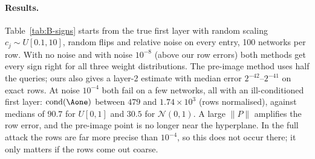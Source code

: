 \paragraph{Results.}
Table~\ref{tab:B-signs} starts from the true first layer with random scaling
$c_j\sim U[0.1,10]$, random flips and relative noise on every entry, 100
networks per row. With no noise and with noise $10^{-8}$ (above our row
errors) both methods get every sign right for all three weight distributions.
The pre-image method uses half the queries; ours also gives a layer-2
estimate with median error $2^{-42}$--$2^{-41}$ on exact rows. At noise
$10^{-4}$ both fail on a few networks, all with an ill-conditioned first
layer: $\operatorname{cond}(\Aone)$ between $479$ and $1.74\times10^{3}$ (rows
normalised), against medians of $90.7$ for $U[0,1]$ and $30.5$ for
$\mathcal N(0,1)$. A large $\|P\|$ amplifies the row error, and the pre-image
point is no longer near the hyperplane. In the full attack the rows are far
more precise than $10^{-4}$, so this does not occur there; it only matters if
the rows come out coarse.

\begin{table}[t]
\centering
\caption{Sign recovery on 100 networks per row. Succ.: networks with all
$10$ signs correct. Last column: median over networks of the output-layer
error obtained as a by-product of our method.}
\label{tab:B-signs}
\setlength{\tabcolsep}{4pt}

\end{table}
